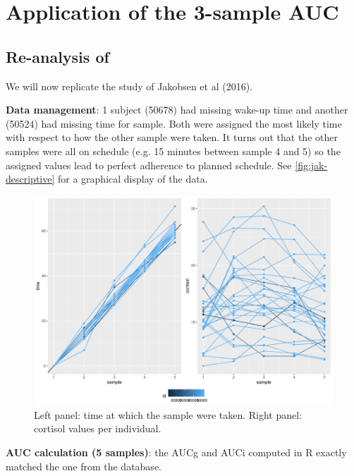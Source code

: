 \documentclass[12pt]{article}
\begin{document}
\FloatBarrier
\clearpage

\section{Application of the 3-sample AUC}
\label{sec:orgfe5ecea}
\subsection{Re-analysis of \citep{jakobsen2016brain}}
\label{sec:org50f3d8f}

We will now replicate the study of Jakobsen et al (2016).

\bigskip

\textbf{Data management}: 1 subject (50678) had missing wake-up time and
another (50524) had missing time for sample. Both were assigned the
most likely time with respect to how the other sample were taken. It
turns out that the other samples were all on schedule (e.g. 15 minutes
between sample 4 and 5) so the assigned values lead to perfect
adherence to planned schedule. See \autoref{fig:jak-descriptive} for a
graphical display of the data.

\begin{figure}[!h]
\centering
\includegraphics[width=1\textwidth]{./figures/gg-jak-descriptive.pdf}
\caption{\label{fig:jak-descriptive}Left panel: time at which the sample were taken. Right panel: cortisol values per individual.}
\end{figure}


\bigskip

\textbf{AUC calculation (5 samples)}: the AUCg and AUCi computed in R exactly
 matched the one from the database.
\end{document}
